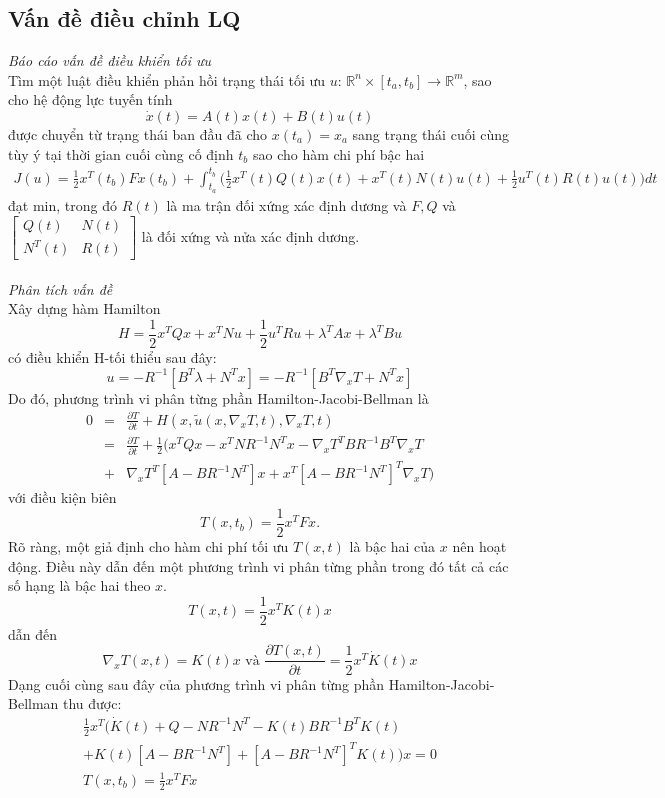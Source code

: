 \documentclass[12pt,a4paper]{report}
\begin{document}
	\subsection{Vấn đề điều chỉnh LQ}
	\textit{Báo cáo vấn đề điều khiển tối ưu}\\
	Tìm một luật điều khiển phản hồi trạng thái tối ưu $u$: $\mathbb{R}^n \times [t_a, t_b] \to \mathbb{R}^m$, sao cho hệ động lực tuyến tính $$\dot{x}(t)=A(t)x(t) + B(t)u(t)$$ được chuyển từ trạng thái ban đầu đã cho $x(t_a) = x_a$ sang trạng thái cuối cùng tùy ý tại  thời gian cuối cùng cố định $t_b$ sao cho hàm chi phí bậc hai
	\begin{eqnarray}
		J(u) =  \frac{1}{2}x^T(t_b)Fx(t_b) + \int_{t_a}^{t_b}\Big(\frac{1}{2}x^T(t)Q(t)x(t) + x^T(t)N(t)u(t) + \frac{1}{2}u^T(t)R(t)u(t)\Big)dt \nonumber
	\end{eqnarray} đạt min, trong đó $R(t)$ là ma trận đối xứng xác định dương và $F, Q$ và $\begin{bmatrix}
		Q(t)&N(t)\\N^T(t)&R(t)
	\end{bmatrix}$ là đối xứng và nửa xác định dương.\\\\
	\textit{Phân tích vấn đề}
	\\Xây dựng hàm Hamilton $$H = \frac{1}{2}x^TQx + x^TNu + \frac{1}{2}u^TRu + \lambda^TAx + \lambda^TBu$$ có điều khiển H-tối thiểu sau đây: $$u = -R^{-1}[B^T\lambda + N^Tx] = -R^{-1}[B^T\nabla_xT + N^Tx]$$ Do đó, phương trình vi phân từng phần Hamilton-Jacobi-Bellman là
	\begin{eqnarray}
		0 &=& \frac{\partial T}{\partial t} + H(x, \tilde{u}(x, \nabla_xT,t),\nabla_xT,t) \nonumber \\ &=& \frac{\partial T}{\partial t} + \frac{1}{2}\Big(x^TQx-x^TNR^{-1}N^Tx-\nabla_xT^TBR^{-1}B^T\nabla_xT \nonumber \\ &+& \nabla_xT^T[A-BR^{-1}N^T]x+x^T[A-BR^{-1}N^T]^T\nabla_xT\Big) \nonumber
	\end{eqnarray} với điều kiện biên $$T(x, t_b) = \frac{1}{2}x^TFx.$$
	Rõ ràng, một giả định cho hàm chi phí tối ưu $T(x, t)$ là bậc hai của $x$ nên hoạt động. Điều này dẫn đến một phương trình vi phân từng phần trong đó tất cả các số hạng là bậc hai theo $x$. $$T(x, t) = \frac{1}{2}x^TK(t)x$$ dẫn đến $$\nabla_xT(x, t) = K(t)x \text{ và } \frac{\partial T(x, t)}{\partial t} = \frac{1}{2}x^T \dot{K}(t)x$$ Dạng cuối cùng sau đây của phương trình vi phân từng phần Hamilton-Jacobi-Bellman thu được:
	\begin{eqnarray}
		\frac{1}{2}x^T \Big(\dot{K}(t) + Q - NR^{-1}N^T - K(t)BR^{-1}B^TK(t) \nonumber \\ + K(t)[A-BR^{-1}N^T] + [A - BR^{-1}N^T]^TK(t)\Big)x = 0 \nonumber\\
		T(x, t_b) = \frac{1}{2}x^TFx \nonumber
	\end{eqnarray}
\end{document}
